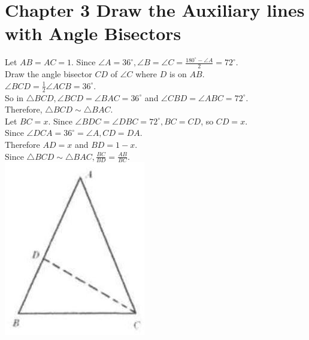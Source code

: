 \documentclass[10pt]{article}
\begin{document}
\section*{Chapter 3 Draw the Auxiliary lines with Angle Bisectors}
Let \(A B=A C=1\). Since \(\angle A=36^{\circ}, \angle B=\angle C=\frac{180^{\circ}-\angle A}{2}=72^{\circ}\).\\
Draw the angle bisector \(C D\) of \(\angle C\) where \(D\) is on \(A B\).\\
\(\angle B C D=\frac{1}{2} \angle A C B=36^{\circ}\).\\
So in \(\triangle B C D, \angle B C D=\angle B A C=36^{\circ}\) and \(\angle C B D=\angle A B C=72^{\circ}\).\\
Therefore, \(\triangle B C D \sim \triangle B A C\).\\
Let \(B C=x\). Since \(\angle B D C=\angle D B C=72^{\circ}, B C=C D\), so \(C D=x\).\\
Since \(\angle D C A=36^{\circ}=\angle A, C D=D A\).\\
Therefore \(A D=x\) and \(B D=1-x\).\\
Since \(\triangle B C D \sim \triangle B A C, \frac{B C}{B D}=\frac{A B}{B C}\).\\
\includegraphics[max width=\textwidth, center]{2025_04_17_97bc1f7e44d93c271a88g-062(1)}
\end{document}
